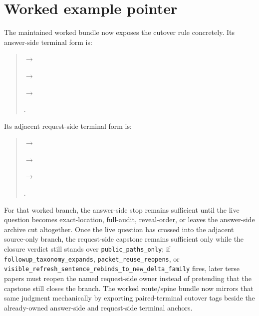 \documentclass[11pt]{article}
\begin{document}
\section{Worked example pointer}
The maintained worked bundle now exposes the cutover rule concretely.
Its answer-side terminal form is:
\begin{quote}\small
{}\par
$\to$\par
{}\par
$\to$\par
{}\par
$\to$\par
{}.
\end{quote}
Its adjacent request-side terminal form is:
\begin{quote}\small
{}\par
$\to$\par
{}\par
$\to$\par
{}\par
$\to$\par
{}.
\end{quote}
For that worked branch, the answer-side stop remains sufficient until the live question becomes exact-location, full-audit, reveal-order, or leaves the answer-side archive cut altogether.
Once the live question has crossed into the adjacent source-only branch, the request-side capstone remains sufficient only while the closure verdict still stands over \texttt{public\_paths\_only}; if \texttt{followup\_taxonomy\_expands}, \texttt{packet\_reuse\_reopens}, or \texttt{visible\_refresh\_sentence\_rebinds\_to\_new\_delta\_family} fires, later terse papers must reopen the named request-side owner instead of pretending that the capstone still closes the branch.
The worked route/spine bundle now mirrors that same judgment mechanically by exporting paired-terminal cutover tags beside the already-owned answer-side and request-side terminal anchors.
\end{document}
